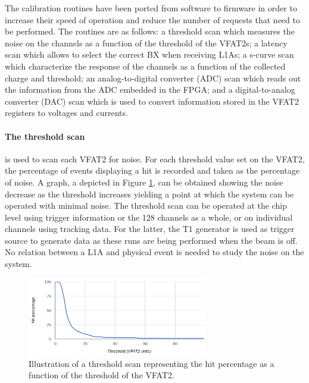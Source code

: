       The calibration routines have been ported from software to firmware in order to increase their speed of operation and reduce the number of requests that need to be performed. The routines are as follows: a threshold scan which measures the noise on the channels as a function of the threshold of the VFAT2s; a latency scan which allows to select the correct BX when receiving L1As; a s-curve scan which characterize the response of the channels as a function of the collected charge and threshold; an analog-to-digital converter (ADC) scan which reads out the information from the ADC embedded in the FPGA; and a digital-to-analog converter (DAC) scan which is used to convert information stored in the VFAT2 registers to voltages and currents.

      \paragraph{The threshold scan} is used to scan each VFAT2 for noise. For each threshold value set on the VFAT2, the percentage of events displaying a hit is recorded and taken as the percentage of noise. A graph, a depicted in Figure \ref{fig:II-3-threshold-scan}, can be obtained showing the noise decrease as the threshold increases yielding a point at which the system can be operated with minimal noise. The threshold scan can be operated at the chip level using trigger information or the 128 channels as a whole, or on individual channels using tracking data. For the latter, the T1 generator is used as trigger source to generate data as these runs are being performed when the beam is off. No relation between a L1A and physical event is needed to study the noise on the system.

      \begin{figure}[h!]
        \centering
        \includegraphics[width=0.7\textwidth]{img/II-3-test-beam/threshold_scan.png}
        \caption{Illustration of a threshold scan representing the hit percentage as a function of the threshold of the VFAT2.}
        \label{fig:II-3-threshold-scan}
      \end{figure}

